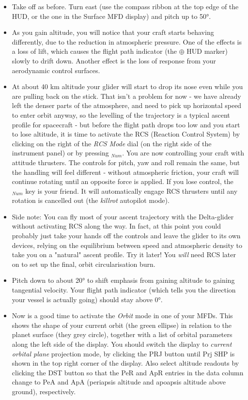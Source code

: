 \documentclass[Orbiter User Manual.tex]{subfiles}
\begin{document}
\begin{itemize}
\item Take off as before. Turn east (use the compass ribbon at the top edge of the HUD, or the one in the Surface MFD display) and pitch up to 50°.
\item As you gain altitude, you will notice that your craft starts behaving differently, due to the reduction in atmospheric pressure. One of the effects is a loss of lift, which causes the flight path indicator (the $\oplus$ HUD marker) slowly to drift down. Another effect is the loss of response from your aerodynamic control surfaces.
\item At about 40 km altitude your glider will start to drop its nose even while you are pulling back on the stick. That isn't a problem for now - we have already left the denser parts of the atmosphere, and need to pick up horizontal speed to enter orbit anyway, so the levelling of the trajectory is a typical ascent profile for spacecraft - but before the flight path drops too low and you start to lose altitude, it is time to activate the RCS (Reaction Control System) by clicking on the right of the \textit{RCS Mode} dial (on the right side of the instrument panel) or by pressing \Ctrl\keystroke{/}$_{Num}$. You are now controlling your craft with attitude thrusters. The controls for pitch, yaw and roll remain the same, but the handling will feel different - without atmospheric friction, your craft will continue rotating until an opposite force is applied. If you lose control, the $_{Num}$ key is your friend. It will automatically engage RCS thrusters until any rotation is cancelled out (the \textit{killrot} autopilot mode).
\item Side note: You can fly most of your ascent trajectory with the Delta-glider without activating RCS along the way. In fact, at this point you could probably just take your hands off the controls and leave the glider to its own devices, relying on the equilibrium between speed and atmospheric density to take you on a "natural" ascent profile. Try it later! You \textit{will} need RCS later on to set up the final, orbit circularisation burn.
 \item Pitch down to about 20° to shift emphasis from gaining altitude to gaining tangential velocity. Your flight path indicator (which tells you the direction your vessel is actually going) should stay above 0°.
\item Now is a good time to activate the \textit{Orbit} mode in one of your MFDs. This shows the shape of your current orbit (the green ellipse) in relation to the planet surface (they grey circle), together with a list of orbital parameters along the left side of the display. You should switch the display to \textit{current orbital plane} projection mode, by clicking the PRJ button until Prj SHP is shown in the top right corner of the display. Also select altitude readouts by clicking the DST button so that the PeR and ApR entries in the data column change to PeA and ApA (periapsis altitude and apoapsis altitude above ground), respectively.

\end{itemize}
\end{document}
